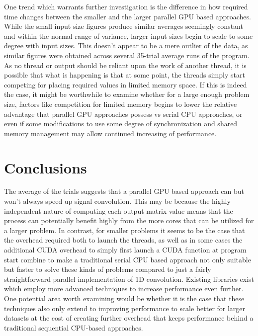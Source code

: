 \documentclass{article}
\begin{document}
One trend which warrants further investigation is the difference in how required time changes between the smaller and the larger parallel GPU based approaches. While the small input size figures produce similar averages seemingly constant and within the normal range of variance, larger input sizes begin to scale to some degree with input sizes. This doesn’t appear to be a mere outlier of the data, as similar figures were obtained across several 35-trial average runs of the program. As no thread or output should be reliant upon the work of another thread, it is possible that what is happening is that at some point, the threads simply start competing for placing required values in limited memory space. If this is indeed the case, it might be worthwhile to examine whether for a large enough problem size, factors like competition for limited memory begins to lower the relative advantage that parallel GPU approaches possess vs serial CPU approaches, or even if some modifications to use some degree of synchronization and shared memory management may allow continued increasing of performance.                                                                             
\section{Conclusions}
The average of the trials suggests that a parallel GPU based approach can but won’t always speed up signal convolution. This may be because the highly independent nature of computing each output matrix value means that the process can potentially benefit highly from the more cores that can be utilized for a larger problem. In contrast, for smaller problems it seems to be the case that the overhead required both to launch the threads, as well as in some cases the additional CUDA overhead to simply first launch a CUDA function at program start combine to make a traditional serial CPU based approach not only suitable but faster to solve these kinds of problems compared to just a fairly straightforward parallel implementation of 1D convolution. Existing libraries exist which employ more advanced techniques to increase performance even further. One potential area worth examining would be whether it is the case that these techniques also only extend to improving performance to scale better for larger datasets at the cost of creating further overhead that keeps performance behind a traditional sequential CPU-based approaches.

\medskip


\end{document}
